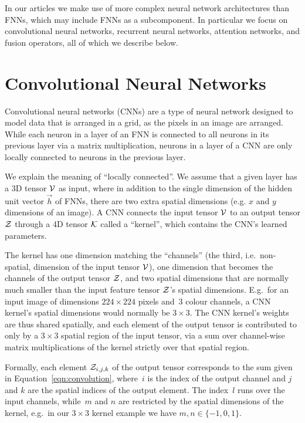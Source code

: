 In our articles we make use of more complex neural network architectures than
FNNs, which may include FNNs as a subcomponent.
In particular we focus on convolutional neural networks, recurrent neural
networks, attention networks, and fusion operators, all of which we describe
below.


\section{Convolutional Neural Networks}

Convolutional neural networks (CNNs) are a type of neural network designed to
model data that is arranged in a grid, as the pixels in an image are arranged.
While each neuron in a layer of an FNN is connected to all neurons in its
previous layer via a matrix multiplication, neurons in a layer of a CNN are
only locally connected to neurons in the previous layer.

We explain the meaning of ``locally connected''. We assume that a given layer
has a 3D tensor $\mathcal{V}$ as input, where in addition to the single dimension
of the hidden unit vector $\vec{h}$ of FNNs, there are two extra spatial
dimensions (e.g. $x$ and $y$ dimensions of an image).  A CNN connects the input
tensor $\mathcal{V}$ to an output tensor $\mathcal{Z}$ through a 4D tensor
$\mathcal{K}$ called a ``kernel'', which contains the CNN's learned parameters.

The kernel has one dimension matching the ``channels'' (the third, i.e.\
non-spatial, dimension of the input tensor $\mathcal{V}$), one dimension that
becomes the channels of the output tensor $\mathcal{Z}$, and two spatial
dimensions that are normally much smaller than the input feature tensor
$\mathcal{Z}$'s spatial dimensions. E.g.\ for an input image of dimensions $224
\times 224$ pixels and~\num{3} colour channels, a CNN kernel's spatial
dimensions would normally be $3 \times 3$. The CNN kernel's weights are thus
shared spatially, and each element of the output tensor is contributed to only
by a $3 \times 3$ spatial region of the input tensor, via a sum over
channel-wise matrix multiplications of the kernel strictly over that spatial
region.

Formally, each element $\mathcal{Z}_{i, j, k}$ of the output tensor corresponds to the
sum given in Equation~\ref{eqn:convolution}, where~$i$ is the index of the
output channel and $j$ and $k$ are the spatial indices of the output element.
The index~$l$ runs over the input channels, while~$m$ and $n$ are restricted by
the spatial dimensions of the kernel, e.g.\ in our $3 \times 3$ kernel example
we have $m, n \in \{-1, 0, 1\}$.

